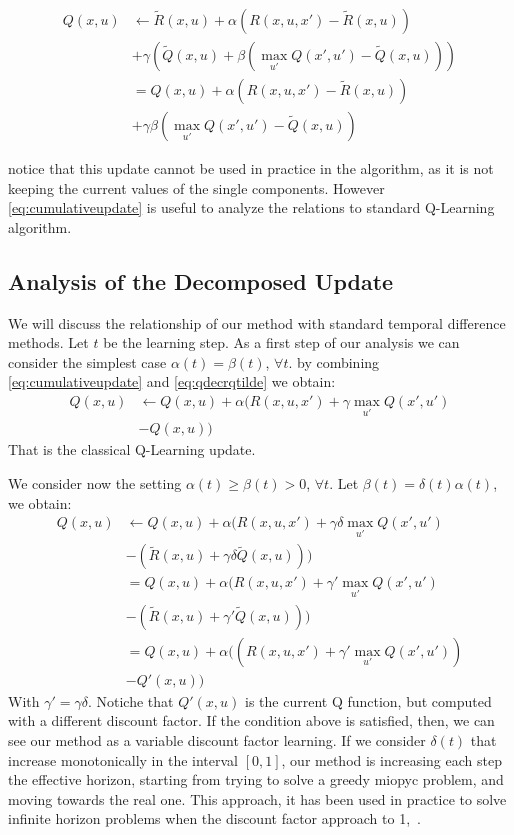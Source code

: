 \documentclass[conference]{IEEEtran}
\begin{document}
\begin{align}
Q(x,u) & \leftarrow\tilde{R}(x,u)+\alpha(R(x,u,x')-\tilde{R}(x,u)) \nonumber\\
 & +\gamma\left(\tilde{Q}(x,u)+\beta(\max_{u'}Q(x',u')-\tilde{Q}(x,u))\right) \nonumber\\
 & =Q(x,u)+\alpha(R(x,u,x')-\tilde{R}(x,u)) \nonumber\\
 & +\gamma\beta(\max_{u'}Q(x',u')-\tilde{Q}(x,u))
 \label{eq:cumulativeupdate}
\end{align}

notice that this update cannot be used in practice in the algorithm, as it is not keeping the current values of the single components. However \ref{eq:cumulativeupdate} is useful to analyze the relations to standard Q-Learning algorithm.

\subsection{Analysis of the Decomposed Update}
We will discuss the relationship of our method with standard temporal difference methods. Let $t$ be the learning step. As a first step of our analysis we can consider the simplest case $\alpha(t)=\beta(t)$, $\forall t$.
by combining \ref{eq:cumulativeupdate} and \ref{eq:qdecrqtilde} we obtain:
\begin{align}
Q(x,u) & \leftarrow Q(x,u)+\alpha(R(x,u,x')+\gamma\max_{u'}Q(x',u')\nonumber\\
 & -Q(x,u))
\end{align}
That is the classical Q-Learning update. 

We consider now the setting $\alpha(t)\geq\beta(t)>0$, $\forall t$. Let $\beta(t)=\delta(t)\alpha(t)$, we obtain:
\begin{align}
Q(x,u) & \leftarrow Q(x,u)+\alpha(R(x,u,x')+\gamma\delta \max_{u'}Q(x',u') \nonumber\\
 & -(\tilde{R}(x,u)+\gamma\delta\tilde{Q}(x,u))) \nonumber\\
 & =Q(x,u)+\alpha(R(x,u,x')+\gamma'\max_{u'}Q(x',u') \nonumber\\
 & -(\tilde{R}(x,u)+\gamma'\tilde{Q}(x,u))) \nonumber\\
 & =Q(x,u)+\alpha((R(x,u,x')+\gamma'\max_{u'}Q(x',u')) \nonumber\\
 & -Q'(x,u))
\end{align}
With $\gamma'=\gamma\delta$. Notiche that $Q'(x,u)$ is the current Q function, but computed with a different discount factor. If the condition above is satisfied, then, we can see our method as a variable discount factor learning. If we consider $\delta(t)$ that increase monotonically in the interval $[0,1]$, our method is increasing each step the effective horizon, starting from trying to solve a greedy miopyc problem, and moving towards the real one. This approach, it has been used in practice to solve infinite horizon problems when the discount factor approach to 1,~\cite{}.
\end{document}
